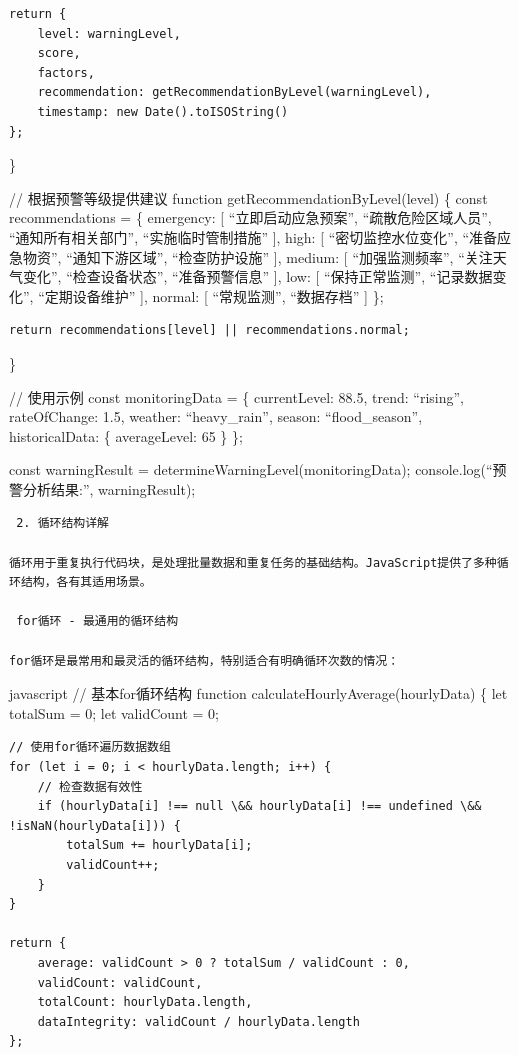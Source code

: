 {\begin{verbatim}
return {
    level: warningLevel,
    score,
    factors,
    recommendation: getRecommendationByLevel(warningLevel),
    timestamp: new Date().toISOString()
};
\end{verbatim}

\}

// 根据预警等级提供建议 function getRecommendationByLevel(level) \{ const recommendations = \{ emergency: {[} ``立即启动应急预案'', ``疏散危险区域人员'', ``通知所有相关部门'', ``实施临时管制措施'' {]}, high: {[} ``密切监控水位变化'', ``准备应急物资'', ``通知下游区域'', ``检查防护设施'' {]}, medium: {[} ``加强监测频率'', ``关注天气变化'', ``检查设备状态'', ``准备预警信息'' {]}, low: {[} ``保持正常监测'', ``记录数据变化'', ``定期设备维护'' {]}, normal: {[} ``常规监测'', ``数据存档'' {]} \};

\begin{verbatim}
return recommendations[level] || recommendations.normal;
\end{verbatim}

\}

// 使用示例 const monitoringData = \{ currentLevel: 88.5, trend: ``rising'', rateOfChange: 1.5, weather: ``heavy\_rain'', season: ``flood\_season'', historicalData: \{ averageLevel: 65 \} \};

const warningResult = determineWarningLevel(monitoringData); console.log(``预警分析结果:'', warningResult);

\begin{lstlisting}
 2. 循环结构详解

循环用于重复执行代码块，是处理批量数据和重复任务的基础结构。JavaScript提供了多种循环结构，各有其适用场景。

 for循环 - 最通用的循环结构

for循环是最常用和最灵活的循环结构，特别适合有明确循环次数的情况：
\end{lstlisting}

javascript // 基本for循环结构 function calculateHourlyAverage(hourlyData) \{ let totalSum = 0; let validCount = 0;

\begin{verbatim}
// 使用for循环遍历数据数组
for (let i = 0; i < hourlyData.length; i++) {
    // 检查数据有效性
    if (hourlyData[i] !== null \&& hourlyData[i] !== undefined \&& !isNaN(hourlyData[i])) {
        totalSum += hourlyData[i];
        validCount++;
    }
}

return {
    average: validCount > 0 ? totalSum / validCount : 0,
    validCount: validCount,
    totalCount: hourlyData.length,
    dataIntegrity: validCount / hourlyData.length
};
\end{verbatim}

}
